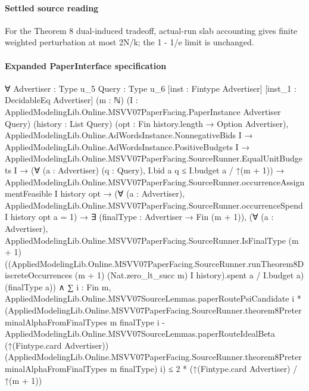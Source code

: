 \documentclass[10pt]{article}
\begin{document}
\paragraph{Settled source reading}
\begin{sloppypar}
For the Theorem 8 dual-\allowbreak{}induced tradeoff, actual-\allowbreak{}run slab accounting gives finite weighted perturbation at most 2N/\allowbreak{}k;\allowbreak{} the 1 -\allowbreak{} 1/\allowbreak{}e limit is unchanged.\allowbreak{}
\end{sloppypar}

\paragraph{Expanded PaperInterface specification}
\begin{ReviewVerbatim}
∀ {Advertiser : Type u_5} {Query : Type u_6} [inst : Fintype Advertiser] [inst_1 : DecidableEq Advertiser] (m : ℕ)
  (I : AppliedModelingLib.Online.MSVV07PaperFacing.PaperInstance Advertiser Query) (history : List Query)
  (opt : Fin history.length → Option Advertiser),
  AppliedModelingLib.Online.AdWordsInstance.NonnegativeBids I →
    AppliedModelingLib.Online.AdWordsInstance.PositiveBudgets I →
      AppliedModelingLib.Online.MSVV07PaperFacing.SourceRunner.EqualUnitBudgets I →
        (∀ (a : Advertiser) (q : Query), I.bid a q ≤ I.budget a / ↑(m + 1)) →
          AppliedModelingLib.Online.MSVV07PaperFacing.SourceRunner.occurrenceAssignmentFeasible I history opt →
            (∀ (a : Advertiser),
                AppliedModelingLib.Online.MSVV07PaperFacing.SourceRunner.occurrenceSpend I history opt a = 1) →
              ∃ (finalType : Advertiser → Fin (m + 1)),
                (∀ (a : Advertiser),
                    AppliedModelingLib.Online.MSVV07PaperFacing.SourceRunner.IsFinalType (m + 1)
                      ((AppliedModelingLib.Online.MSVV07PaperFacing.SourceRunner.runTheorem8DiscreteOccurrences (m + 1)
                              (Nat.zero_lt_succ m) I history).spent
                          a /
                        I.budget a)
                      (finalType a)) ∧
                  ∑ i : Fin m,
                      AppliedModelingLib.Online.MSVV07SourceLemmas.paperRoutePsiCandidate i *
                        (AppliedModelingLib.Online.MSVV07PaperFacing.SourceRunner.theorem8PreterminalAlphaFromFinalTypes
                            m finalType i -
                          AppliedModelingLib.Online.MSVV07SourceLemmas.paperRouteIdealBeta (↑(Fintype.card Advertiser))
                            (AppliedModelingLib.Online.MSVV07PaperFacing.SourceRunner.theorem8PreterminalAlphaFromFinalTypes
                              m finalType)
                            i) ≤
                    2 * (↑(Fintype.card Advertiser) / ↑(m + 1))
\end{ReviewVerbatim}
\end{document}
